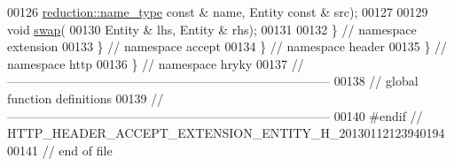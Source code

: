 \begin{DoxyCode}
00126         \hyperlink{namespacehryky_1_1reduction_ac686c30a4c8d196bbd0f05629a6b921f}{reduction::name_type} \textcolor{keyword}{const} & name, Entity \textcolor{keyword}{const} & src);
00127 
00129     \textcolor{keywordtype}{void} \hyperlink{namespacehryky_1_1http_a38e62595ad532d18fbc65ceb61973aec}{swap}(
00130         Entity & lhs, Entity & rhs);
00131 
00132 \} \textcolor{comment}{// namespace extension}
00133 \} \textcolor{comment}{// namespace accept}
00134 \} \textcolor{comment}{// namespace header}
00135 \} \textcolor{comment}{// namespace http}
00136 \} \textcolor{comment}{// namespace hryky}
00137 \textcolor{comment}{//
      ------------------------------------------------------------------------------}
00138 \textcolor{comment}{// global function definitions}
00139 \textcolor{comment}{//
      ------------------------------------------------------------------------------}
00140 \textcolor{preprocessor}{#endif // HTTP\_HEADER\_ACCEPT\_EXTENSION\_ENTITY\_H\_20130112123940194}
00141 \textcolor{preprocessor}{}\textcolor{comment}{// end of file}
\end{DoxyCode}
